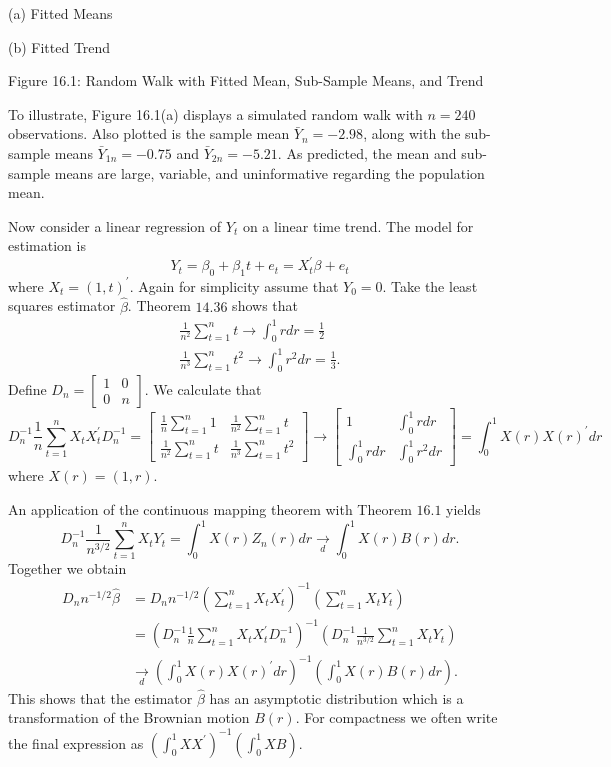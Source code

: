 \documentclass[10pt]{article}
\begin{document}
(a) Fitted Means

(b) Fitted Trend

Figure 16.1: Random Walk with Fitted Mean, Sub-Sample Means, and Trend

To illustrate, Figure 16.1(a) displays a simulated random walk with $n=240$ observations. Also plotted is the sample mean $\bar{Y}_{n}=-2.98$, along with the sub-sample means $\bar{Y}_{1 n}=-0.75$ and $\bar{Y}_{2 n}=-5.21$. As predicted, the mean and sub-sample means are large, variable, and uninformative regarding the population mean.

Now consider a linear regression of $Y_{t}$ on a linear time trend. The model for estimation is
$$
Y_{t}=\beta_{0}+\beta_{1} t+e_{t}=X_{t}^{\prime} \beta+e_{t}
$$
where $X_{t}=(1, t)^{\prime}$. Again for simplicity assume that $Y_{0}=0$. Take the least squares estimator $\widehat{\beta}$. Theorem $14.36$ shows that
$$
\begin{gathered}
\frac{1}{n^{2}} \sum_{t=1}^{n} t \rightarrow \int_{0}^{1} r d r=\frac{1}{2} \\
\frac{1}{n^{3}} \sum_{t=1}^{n} t^{2} \rightarrow \int_{0}^{1} r^{2} d r=\frac{1}{3} .
\end{gathered}
$$
Define $D_{n}=\left[\begin{array}{ll}1 & 0 \\ 0 & n\end{array}\right]$. We calculate that
$$
D_{n}^{-1} \frac{1}{n} \sum_{t=1}^{n} X_{t} X_{t}^{\prime} D_{n}^{-1}=\left[\begin{array}{cc}
\frac{1}{n} \sum_{t=1}^{n} 1 & \frac{1}{n^{2}} \sum_{t=1}^{n} t \\
\frac{1}{n^{2}} \sum_{t=1}^{n} t & \frac{1}{n^{3}} \sum_{t=1}^{n} t^{2}
\end{array}\right] \rightarrow\left[\begin{array}{cc}
1 & \int_{0}^{1} r d r \\
\int_{0}^{1} r d r & \int_{0}^{1} r^{2} d r
\end{array}\right]=\int_{0}^{1} X(r) X(r)^{\prime} d r
$$
where $X(r)=(1, r)$.

An application of the continuous mapping theorem with Theorem $16.1$ yields
$$
D_{n}^{-1} \frac{1}{n^{3 / 2}} \sum_{t=1}^{n} X_{t} Y_{t}=\int_{0}^{1} X(r) Z_{n}(r) d r \underset{d}{\longrightarrow} \int_{0}^{1} X(r) B(r) d r .
$$
Together we obtain
$$
\begin{aligned}
D_{n} n^{-1 / 2} \widehat{\beta} &=D_{n} n^{-1 / 2}\left(\sum_{t=1}^{n} X_{t} X_{t}^{\prime}\right)^{-1}\left(\sum_{t=1}^{n} X_{t} Y_{t}\right) \\
&=\left(D_{n}^{-1} \frac{1}{n} \sum_{t=1}^{n} X_{t} X_{t}^{\prime} D_{n}^{-1}\right)^{-1}\left(D_{n}^{-1} \frac{1}{n^{3 / 2}} \sum_{t=1}^{n} X_{t} Y_{t}\right) \\
& \underset{d}{\longrightarrow}\left(\int_{0}^{1} X(r) X(r)^{\prime} d r\right)^{-1}\left(\int_{0}^{1} X(r) B(r) d r\right) .
\end{aligned}
$$
This shows that the estimator $\widehat{\beta}$ has an asymptotic distribution which is a transformation of the Brownian motion $B(r)$. For compactness we often write the final expression as $\left(\int_{0}^{1} X X^{\prime}\right)^{-1}\left(\int_{0}^{1} X B\right)$.
\end{document}
